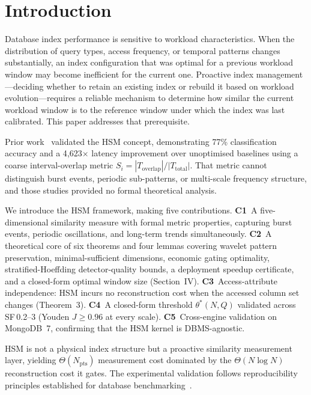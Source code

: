 \documentclass[10pt,twocolumn,a4paper]{article}
\newcommand{\Npts}{N_{\mathrm{pts}}}
\newcommand{\thetastar}{\theta^{*}}
\begin{document}
\section{Introduction}

Database index performance is sensitive to workload characteristics. When
the distribution of query types, access frequency, or temporal patterns
changes substantially, an index configuration that was optimal for a
previous workload window may become inefficient for the current one.
Proactive index management---deciding whether to retain an existing index
or rebuild it based on workload evolution---requires a reliable mechanism
to determine how similar the current workload window is to the reference
window under which the index was last calibrated. This paper addresses
that prerequisite.

Prior work~\cite{Reungsinkonkarn2026iEEECON,Reungsilpkolkarn2026ICICT}
validated the HSM concept, demonstrating 77\% classification accuracy and
a 4{,}623$\times$ latency improvement over unoptimised baselines using a
coarse interval-overlap metric $S_i=|T_{\mathrm{overlap}}|/|T_{\mathrm{total}}|$.
That metric cannot distinguish burst events, periodic sub-patterns, or
multi-scale frequency structure, and those studies provided no formal
theoretical analysis.

We introduce the HSM framework, making five contributions.
\textbf{C1}~A five-dimensional similarity measure with formal metric
properties, capturing burst events, periodic oscillations, and
long-term trends simultaneously.
\textbf{C2}~A theoretical core of six theorems and four lemmas
covering wavelet pattern preservation, minimal-sufficient dimensions,
economic gating optimality, stratified-Hoeffding detector-quality
bounds, a deployment speedup certificate, and a closed-form optimal
window size (Section~IV).
\textbf{C3}~Access-attribute independence: HSM incurs no
reconstruction cost when the accessed column set changes (Theorem~3).
\textbf{C4}~A closed-form threshold $\thetastar(N,Q)$ validated
across SF\,0.2--3 (Youden $J\!\ge\!0.96$ at every scale).
\textbf{C5}~Cross-engine validation on MongoDB~7, confirming that
the HSM kernel is DBMS-agnostic.

HSM is not a physical index structure but a proactive similarity
measurement layer, yielding $\Theta(\Npts)$ measurement cost dominated by
the $\Theta(N\log N)$ reconstruction cost it gates. The experimental
validation follows reproducibility principles established for database
benchmarking~\cite{Gray1993Benchmark}.
\end{document}
